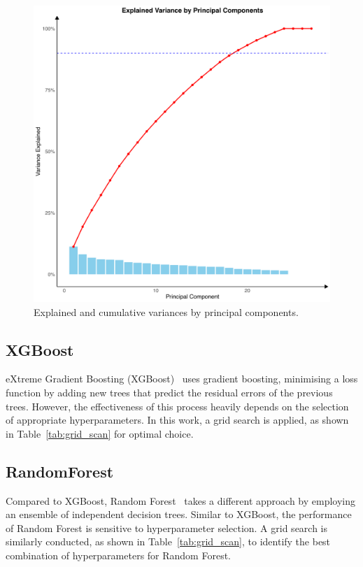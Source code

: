 \documentclass[9pt,twocolumn,twoside]{pnas-new}
\begin{document}
\begin{figure}[!tbhp]
\centering
\includegraphics[width=0.5\linewidth]
{regression/pca_regression_lm.png}
\caption{Explained and cumulative variances by principal components.}
\label{fig:lmpca}
\end{figure}


\subsection*{XGBoost}
eXtreme Gradient Boosting (XGBoost)~\cite{10.1145/2939672.2939785} uses gradient boosting, minimising a loss function by adding new trees that predict the residual errors of the previous trees. However, the effectiveness of this process heavily depends on the selection of appropriate hyperparameters. In this work, a grid search is applied, as shown in Table~\ref{tab:grid_scan} for optimal choice.



\subsection*{RandomForest}

Compared to XGBoost, Random Forest~\cite{Breiman2001} takes a different approach by employing an ensemble of independent decision trees.  Similar to XGBoost, the performance of Random Forest is sensitive to hyperparameter selection. A grid search is similarly conducted, as shown in Table~\ref{tab:grid_scan}, to identify the best combination of hyperparameters for Random Forest.
\end{document}
